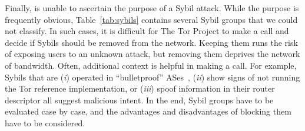 Finally, \sys is unable to ascertain the purpose of a Sybil attack.  While the
purpose is frequently obvious, Table~\ref{tab:sybils} contains several Sybil
groups that we could not classify.  In such cases, it is difficult for The Tor
Project to make a call and decide if Sybils should be removed from the network.
Keeping them runs the risk of exposing users to an unknown attack, but removing
them deprives the network of bandwidth.  Often, additional context is helpful in
making a call.  For example, Sybils that are (\emph{i}) operated in
``bulletproof'' ASes~\cite{Konte2015a}, (\emph{ii}) show signs of not running
the Tor reference implementation, or (\emph{iii}) spoof information in their
router descriptor all suggest malicious intent.  In the end, Sybil groups have
to be evaluated case by case, and the advantages and disadvantages of blocking
them have to be considered.
